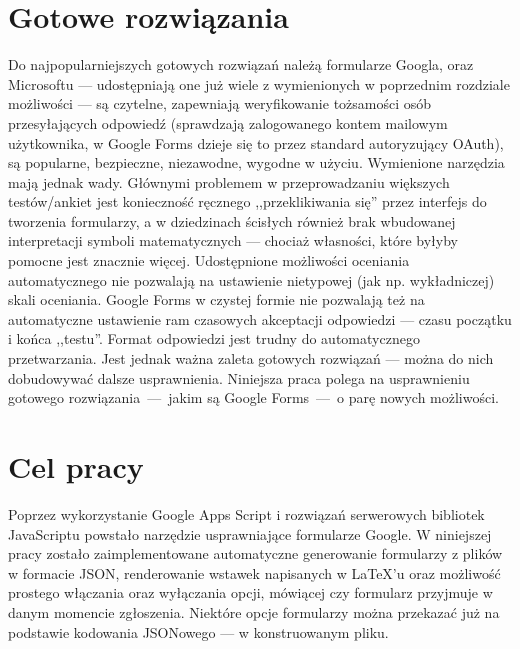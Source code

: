 \section{Gotowe rozwiązania}
Do najpopularniejszych gotowych rozwiązań należą formularze Googla, oraz Microsoftu --- udostępniają one już wiele z  wymienionych w poprzednim rozdziale możliwości --- są czytelne, zapewniają weryfikowanie  tożsamości osób przesyłających odpowiedź (sprawdzają zalogowanego kontem mailowym użytkownika, w Google Forms dzieje się  to przez standard autoryzujący OAuth), są popularne, bezpieczne, niezawodne, wygodne w użyciu.
\ind Wymienione narzędzia mają jednak wady. Głównymi problemem w przeprowadzaniu większych testów/ankiet jest konieczność ręcznego ,,przeklikiwania się'' przez interfejs do tworzenia formularzy, a w dziedzinach ścisłych również brak wbudowanej interpretacji symboli matematycznych --- chociaż własności, które byłyby pomocne jest znacznie więcej. Udostępnione możliwości oceniania automatycznego nie pozwalają na ustawienie nietypowej (jak np. wykładniczej) skali oceniania. Google Forms w czystej formie nie pozwalają też na automatyczne ustawienie ram czasowych akceptacji odpowiedzi --- czasu początku i końca ,,testu''. Format odpowiedzi jest trudny do automatycznego  przetwarzania.
\ind Jest jednak ważna zaleta gotowych rozwiązań --- można do nich dobudowywać dalsze usprawnienia. Niniejsza praca polega na usprawnieniu gotowego rozwiązania~---~jakim są Google Forms~---~o parę nowych możliwości.
\section{Cel pracy}
 Poprzez wykorzystanie Google Apps Script  i rozwiązań serwerowych bibliotek JavaScriptu powstało narzędzie usprawniające formularze Google. W niniejszej pracy zostało zaimplementowane automatyczne generowanie formularzy z plików w formacie JSON, renderowanie wstawek napisanych w \LaTeX{}'u oraz możliwość prostego włączania oraz wyłączania opcji, mówiącej czy formularz przyjmuje w danym momencie zgłoszenia. Niektóre opcje formularzy można  przekazać już na podstawie kodowania JSONowego --- w konstruowanym pliku.

